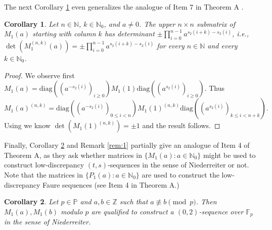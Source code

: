 \documentclass{article}
\newcommand{\PP}{\mathbb P}
\newcommand{\NN}{\mathbb N}
\newcommand{\ZZ}{\mathbb Z}
\newcommand{\FF}{\mathbb F}
\newcommand{\diag}{\mathrm{ diag}}
\newtheorem{coro}{Corollary}
\begin{document}
The next Corollary \ref{cor:3} even generalizes \cite[Theorem~1]{mereb} the analogue of Item 7 in Theorem A . 
\begin{coro}\label{cor:3}Let $n\in\NN$, $k\in\NN_0$, and $a\neq 0$. The upper $n\times n$ submatrix of $M_1(a)$ starting with column $k$ has determinant $ \pm \prod_{i=0}^{n-1}a^{s_2(i+k)-s_2(i)}$, i.e., $\det(M_1^{(n,k)}(a))=\pm \prod_{i=0}^{n-1}a^{s_2(i+k)-s_2(i)}$ for every $n\in\NN$ and every $k\in\NN_0$. %
\end{coro}

\begin{proof}
We observe first $M_1(a)=\diag((a^{-s_2(i)})_{i\geq 0})M_1(1) \diag((a^{s_2(i)})_{i\geq 0})$. Thus 
$$M_1(a)^{(n,k)}=\diag((a^{-s_2(i)})_{0\leq i<n}) M_1(1)^{(n,k)}\diag((a^{s_2(i)})_{k\leq i<n+k}) .$$
Using \cite[Theorem~1]{mereb} we know $\det(M_1(1)^{(n,k)})=\pm 1$ and the result follows. 
\end{proof}

Finally, Corollary \ref{cor:4} and Remark \ref{rem:1} partially give an analogue of Item 4 of Theorem A, as they ask whether matrices in $\{M_1(a):a\in\NN_0\}$ might be used to construct low-discrepancy $(t,s)$-sequences in the sense of Niederreiter or not. Note that the matrices in $\{P_1(a):a\in\NN_0\}$ are used to construct the low-discrepancy Faure sequences (see Item 4 in Theorem A.)

\begin{coro}\label{cor:4} Let $p\in\PP$ and $a,b\in\ZZ$ such that $a\not\equiv b\pmod{p}$. Then $M_1(a),M_1(b)$ modulo $p$ are qualified to construct a $(0,2)$-sequence over $\FF_p$ in the sense of Niederreiter.\end{coro} 


\end{document}
